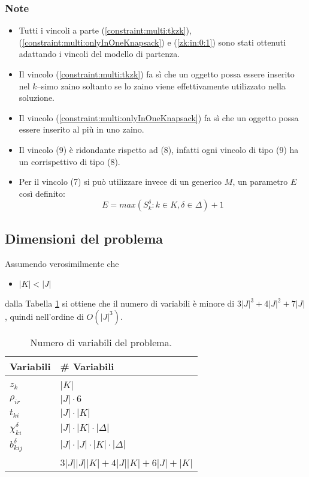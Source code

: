 \documentclass{scrartcl}
\begin{document}
\subsubsection{Note}
\begin{itemize}
\item Tutti i vincoli a parte (\ref{constraint:multi:tkzk}), (\ref{constraint:multi:onlyInOneKnapsack}) e (\ref{zk:in:0:1}) sono stati ottenuti adattando i vincoli del modello di partenza.
\item Il vincolo (\ref{constraint:multi:tkzk}) fa sì che un oggetto possa essere inserito nel $k$--simo zaino soltanto se lo zaino viene effettivamente utilizzato nella soluzione.
\item Il vincolo (\ref{constraint:multi:onlyInOneKnapsack}) fa sì che un oggetto possa essere inserito al più in uno zaino. 
\item Il vincolo (9) è ridondante rispetto ad (8), infatti ogni vincolo di tipo (9) ha un corrispettivo di tipo (8).
\item Per il vincolo (7) si può utilizzare invece di un generico $M$, un parametro $E$ così definito:
$$
E = max(S_k^\delta : k \in K, \delta \in \Delta) + 1
$$ 
\end{itemize}

\subsection{Dimensioni del problema}
\label{sec:orig:dimensioneDelProblema}
Assumendo verosimilmente che 
\begin{itemize}
	\item $|K| < |J|$
\end{itemize}  
dalla Tabella \ref{table:no:variables}
si ottiene che il numero di variabili è minore di $3|J|^3 + 4|J|^2 + 7|J|$, quindi
nell'ordine di $O(|J|^3)$.



\begin{table}[h!]
	\center
	\begin{tabular}{|l|l|}
		\hline
		Variabili & \# Variabili \\
		\hline
		& \\
		$z_k$ & $|K|$ \\
		$\rho_{ir}$ & $|J| \cdot 6$\\
		$t_{ki}$ & $|J| \cdot |K|$ \\
		$\chi_{ki}^\delta$ & $|J| \cdot |K| \cdot | \Delta |$\\
		$b_{kij}^\delta$ & $|J| \cdot |J| \cdot |K| \cdot |\Delta|$\\ 
		& \\
		\hline
		& $3|J||J||K| + 4|J||K|+6|J|+ |K|$ \\
		\hline
	\end{tabular}
	\caption{Numero di variabili del problema.}
	\label{table:no:variables}
\end{table}
\end{document}

